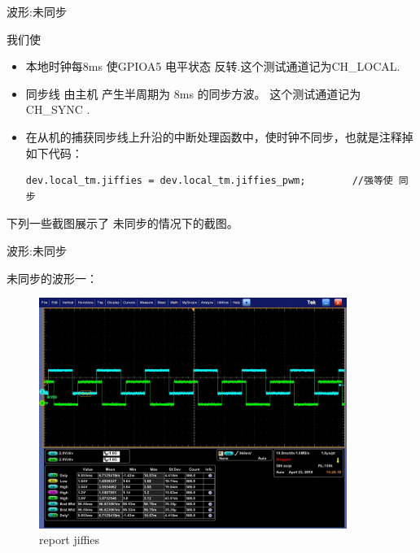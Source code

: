 \begin{frame}[fragile]{波形:未同步}

我们使
\begin{itemize}
  \item 本地时钟每8ms 使GPIOA5 电平状态 反转.这个测试通道记为CH\_LOCAL.
  \item 同步线 由主机 产生半周期为 8ms 的同步方波。 这个测试通道记为CH\_SYNC .
  \item 在从机的捕获同步线上升沿的中断处理函数中，使时钟不同步，也就是注释掉如下代码：
  \begin{lstlisting}
dev.local_tm.jiffies = dev.local_tm.jiffies_pwm;		//强等使 同步
  \end{lstlisting}

\end{itemize}


下列一些截图展示了 未同步的情况下的截图。



\end{frame}


\begin{frame}[fragile]{波形:未同步}

未同步的波形一\label{nosyncwave1}：

  \begin{figure}[htbp]
  \begin{center}
  \includegraphics[width=10cm]{img/nosync1}
  \caption{report jiffies}
  \label{report}
  \end{center}
  \vspace{-0.5em}
  \end{figure}


\end{frame}



